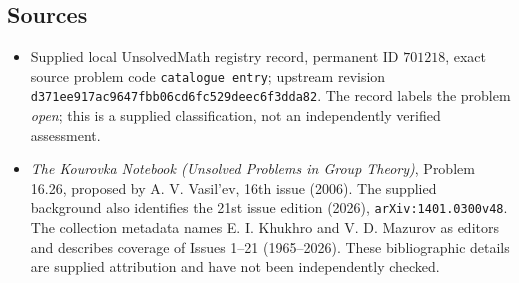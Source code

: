 \documentclass[11pt]{article}
\begin{document}
\subsection{Sources}
\begin{itemize}
\item Supplied local UnsolvedMath registry record, permanent ID \(701218\), exact source problem code \texttt{catalogue entry}; upstream revision \texttt{d371ee917ac9647fbb06cd6fc529deec6f3dda82}. The record labels the problem \emph{open}; this is a supplied classification, not an independently verified assessment.
\item \emph{The Kourovka Notebook (Unsolved Problems in Group Theory)}, Problem 16.26, proposed by A. V. Vasil'ev, 16th issue (2006). The supplied background also identifies the 21st issue edition (2026), \texttt{arXiv:1401.0300v48}. The collection metadata names E. I. Khukhro and V. D. Mazurov as editors and describes coverage of Issues 1--21 (1965--2026). These bibliographic details are supplied attribution and have not been independently checked.
\end{itemize}
\end{document}
